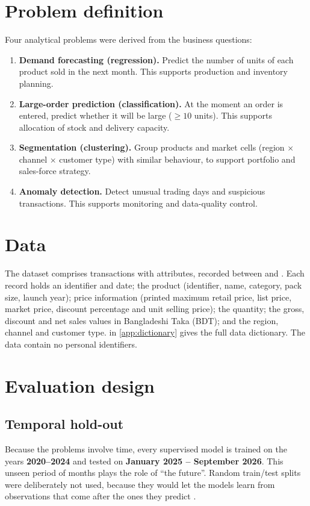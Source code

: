 \section{Problem definition}
Four analytical problems were derived from the business questions:
\begin{enumerate}
  \item \textbf{Demand forecasting (regression).} Predict the number of units of each product sold in the
        next month. This supports production and inventory planning.
  \item \textbf{Large-order prediction (classification).} At the moment an order is entered, predict whether
        it will be large (\(\geq 10\) units). This supports allocation of stock and delivery capacity.
  \item \textbf{Segmentation (clustering).} Group products and market cells (region $\times$ channel $\times$
        customer type) with similar behaviour, to support portfolio and sales-force strategy.
  \item \textbf{Anomaly detection.} Detect unusual trading days and suspicious transactions. This supports
        monitoring and data-quality control.
\end{enumerate}

\section{Data}
The dataset comprises \NRows transactions with \NCols attributes, recorded between \DateMin and \DateMax. Each
record holds an identifier and date; the product (identifier, name, category, pack size, launch year); price
information (printed maximum retail price, list price, market price, discount percentage and unit selling
price); the quantity; the gross, discount and net sales values in Bangladeshi Taka (BDT); and the region,
channel and customer type.  in \cref{app:dictionary} gives the full data dictionary. The
data contain no personal identifiers.

\section{Evaluation design}
\subsection{Temporal hold-out}
Because the problems involve time, every supervised model is trained on the years \textbf{2020--2024} and
tested on \textbf{January 2025 -- September 2026}. This unseen period of \TestMonths months plays the role of
``the future''. Random train/test splits were deliberately not used, because they would let the models learn
from observations that come after the ones they predict \citep{bergmeir2012}.

